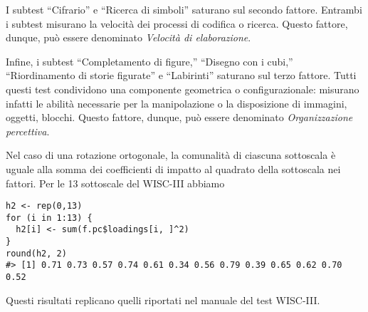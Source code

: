 I subtest ``Cifrario'' e ``Ricerca di simboli'' saturano sul secondo
fattore. Entrambi i subtest misurano la velocità dei processi di
codifica o ricerca. Questo fattore, dunque, può essere denominato
\textit{Velocità di elaborazione}.

Infine, i subtest ``Completamento di figure,'' ``Disegno con i cubi,''
``Riordinamento di storie figurate'' e ``Labirinti'' saturano sul
terzo fattore.  Tutti questi test condividono una componente geometrica
o configurazionale: misurano infatti le abilità necessarie per la
manipolazione o la disposizione di immagini, oggetti, blocchi. Questo
fattore, dunque, può essere denominato \textit{Organizzazione percettiva}.
  
Nel caso di una rotazione ortogonale, la comunalità di ciascuna sottoscala è uguale alla somma dei coefficienti di impatto al quadrato della sottoscala nei fattori.
Per le 13 sottoscale del WISC-III abbiamo 
 
\begin{lstlisting}
h2 <- rep(0,13)
for (i in 1:13) {
  h2[i] <- sum(f.pc$loadings[i, ]^2)
}
round(h2, 2)
#> [1] 0.71 0.73 0.57 0.74 0.61 0.34 0.56 0.79 0.39 0.65 0.62 0.70 0.52 
\end{lstlisting}

\noindent
Questi risultati replicano quelli riportati nel manuale del test  WISC-III.



